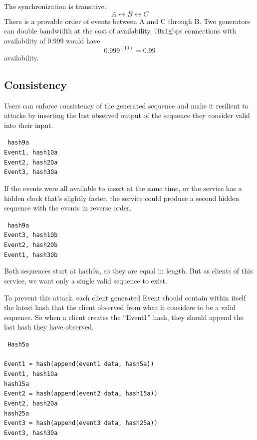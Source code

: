 \documentclass[12pt]{article}
\begin{document}
The synchronization is transitive.  \[A \leftrightarrow B \leftrightarrow C\]  There is a provable order of events between A and C through B.  Two generators can double bandwidth at the cost of availability.  10x1gbps connections with availability of 0.999 would have \[0.999^(10) = 0.99 \] availability.
\subsection{Consistency}
Users can enforce consistency of the generated sequence and make it resilient to attacks by inserting the last observed output of the sequence they consider valid into their input.

\texttt{
hash9a\\
Event1, hash10a\\
Event2, hash20a\\
Event3, hash30a\\
}

If the events were all available to insert at the same time, or the service has a hidden clock that's slightly faster, the service could produce a second hidden sequence with the events in reverse order.  

\texttt{
hash9a\\
Event3, hash10b\\
Event2, hash20b\\
Event1, hash30b\\
}

Both sequences start at hash9a, so they are equal in length.  But as clients of this service, we want only a single valid sequence to exist. 

To prevent this attack, each client generated Event should contain within itself the latest hash that the client observed from what it considers to be a valid sequence.  So when a client creates the “Event1” hash, they should append the last hash they have observed.

\texttt{
\noindent Hash5a\\\\\noindent
Event1 = hash(append(event1 data, hash5a))\\
Event1, hash10a\\
hash15a\\
Event2 = hash(append(event2 data, hash15a))\\
Event2, hash20a\\
hash25a\\
Event3 = hash(append(event3 data, hash25a))\\
Event3, hash30a\\
}
\end{document}
